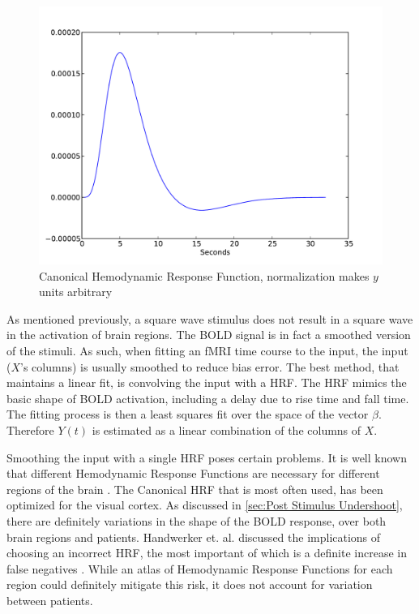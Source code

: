 \begin{figure}
\centering
\includegraphics[scale=.7]{images/HRF}
\caption[Canonical Hemodynamic Response Function]
{Canonical Hemodynamic Response Function, normalization makes $y$ units
arbitrary}
\label{fig:HRF}
\end{figure}

As mentioned previously, a square wave stimulus 
does not result in a square wave in the activation of brain regions. 
The \ac{BOLD} signal is in fact a smoothed version of the 
stimuli. As such, when fitting an \ac{fMRI} time course to the input,
the input ($X$'s columns) is usually smoothed to reduce bias error. 
The best method, that maintains a linear fit, is convolving the input 
with a \ac{HRF}. The \ac{HRF}
mimics the basic shape of \ac{BOLD} activation, including a delay
due to rise time and fall time. The fitting 
process is then a least squares fit over the space of the vector $\beta$. 
Therefore $Y(t)$ is estimated as a linear combination 
of the columns of $X$. 

Smoothing the input with a single \ac{HRF} poses certain problems.
It is well known that different Hemodynamic Response Functions are necessary 
for different regions of the brain \cite{Handwerker2004}. The Canonical 
\ac{HRF} that is most often used, 
has been optimized for the visual cortex. As discussed in \autoref{sec:Post Stimulus Undershoot},
there are definitely variations in the shape of the
\ac{BOLD} response, over both brain regions and patients. Handwerker et. al. 
discussed the implications of choosing an incorrect \ac{HRF}, the most important
of which is a definite increase in false negatives \cite{Handwerker2004}. While an atlas
of Hemodynamic Response Functions for each region could definitely 
mitigate this risk, it does not account for variation between patients.

